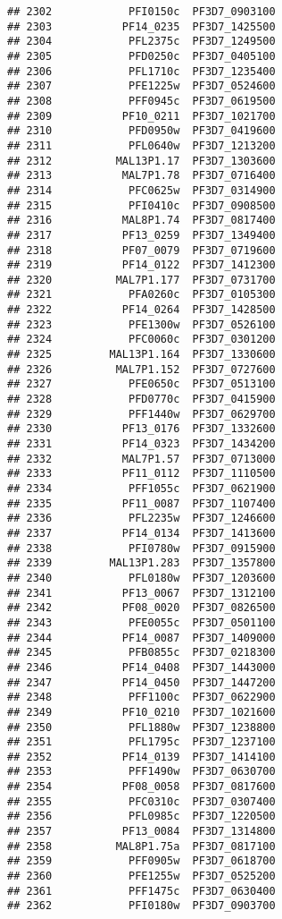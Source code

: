 \documentclass{article}\usepackage[]{graphicx}\usepackage[]{color}
\makeatletter
\newenvironment{kframe}{%
 \def\at@end@of@kframe{}%
 \ifinner\ifhmode%
  \def\at@end@of@kframe{\end{minipage}}%
  \begin{minipage}{\columnwidth}%
 \fi\fi%
 \def\FrameCommand##1{\hskip\@totalleftmargin \hskip-\fboxsep
 \colorbox{shadecolor}{##1}\hskip-\fboxsep
     \hskip-\linewidth \hskip-\@totalleftmargin \hskip\columnwidth}%
 \MakeFramed {\advance\hsize-\width
   \@totalleftmargin\z@ \linewidth\hsize
   \@setminipage}}%
 {\par\unskip\endMakeFramed%
 \at@end@of@kframe}
\newenvironment{knitrout}{}{} %
\makeatother
\begin{document}
\begin{knitrout}
\begin{kframe}
\begin{verbatim}
## 2302            PFI0150c  PF3D7_0903100
## 2303           PF14_0235  PF3D7_1425500
## 2304            PFL2375c  PF3D7_1249500
## 2305            PFD0250c  PF3D7_0405100
## 2306            PFL1710c  PF3D7_1235400
## 2307            PFE1225w  PF3D7_0524600
## 2308            PFF0945c  PF3D7_0619500
## 2309           PF10_0211  PF3D7_1021700
## 2310            PFD0950w  PF3D7_0419600
## 2311            PFL0640w  PF3D7_1213200
## 2312          MAL13P1.17  PF3D7_1303600
## 2313           MAL7P1.78  PF3D7_0716400
## 2314            PFC0625w  PF3D7_0314900
## 2315            PFI0410c  PF3D7_0908500
## 2316           MAL8P1.74  PF3D7_0817400
## 2317           PF13_0259  PF3D7_1349400
## 2318           PF07_0079  PF3D7_0719600
## 2319           PF14_0122  PF3D7_1412300
## 2320          MAL7P1.177  PF3D7_0731700
## 2321            PFA0260c  PF3D7_0105300
## 2322           PF14_0264  PF3D7_1428500
## 2323            PFE1300w  PF3D7_0526100
## 2324            PFC0060c  PF3D7_0301200
## 2325         MAL13P1.164  PF3D7_1330600
## 2326          MAL7P1.152  PF3D7_0727600
## 2327            PFE0650c  PF3D7_0513100
## 2328            PFD0770c  PF3D7_0415900
## 2329            PFF1440w  PF3D7_0629700
## 2330           PF13_0176  PF3D7_1332600
## 2331           PF14_0323  PF3D7_1434200
## 2332           MAL7P1.57  PF3D7_0713000
## 2333           PF11_0112  PF3D7_1110500
## 2334            PFF1055c  PF3D7_0621900
## 2335           PF11_0087  PF3D7_1107400
## 2336            PFL2235w  PF3D7_1246600
## 2337           PF14_0134  PF3D7_1413600
## 2338            PFI0780w  PF3D7_0915900
## 2339         MAL13P1.283  PF3D7_1357800
## 2340            PFL0180w  PF3D7_1203600
## 2341           PF13_0067  PF3D7_1312100
## 2342           PF08_0020  PF3D7_0826500
## 2343            PFE0055c  PF3D7_0501100
## 2344           PF14_0087  PF3D7_1409000
## 2345            PFB0855c  PF3D7_0218300
## 2346           PF14_0408  PF3D7_1443000
## 2347           PF14_0450  PF3D7_1447200
## 2348            PFF1100c  PF3D7_0622900
## 2349           PF10_0210  PF3D7_1021600
## 2350            PFL1880w  PF3D7_1238800
## 2351            PFL1795c  PF3D7_1237100
## 2352           PF14_0139  PF3D7_1414100
## 2353            PFF1490w  PF3D7_0630700
## 2354           PF08_0058  PF3D7_0817600
## 2355            PFC0310c  PF3D7_0307400
## 2356            PFL0985c  PF3D7_1220500
## 2357           PF13_0084  PF3D7_1314800
## 2358          MAL8P1.75a  PF3D7_0817100
## 2359            PFF0905w  PF3D7_0618700
## 2360            PFE1255w  PF3D7_0525200
## 2361            PFF1475c  PF3D7_0630400
## 2362            PFI0180w  PF3D7_0903700

\end{verbatim}
\end{kframe}
\end{knitrout}
\end{document}
